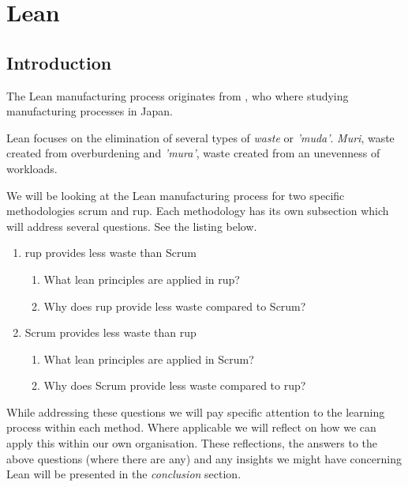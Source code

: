 \chapter{Lean}


\section{Introduction}

The Lean manufacturing process originates from \citep{womack1990machine}, who where studying manufacturing processes in Japan.

Lean focuses on the elimination of several types of \textit{waste} or \textit{'muda'}. \textit{Muri}, waste created from overburdening and \textit{'mura'}, waste created from an unevenness of workloads.

We will be looking at the Lean manufacturing process for two specific methodologies \ac{scrum} and \ac{rup}. Each methodology has its own subsection which will address several questions. See the listing below.
\begin{enumerate}
    \item \ac{rup} provides less waste than Scrum
        \begin{enumerate}
            \item What lean principles are applied in \ac{rup}?
            \item Why does \ac{rup} provide less waste compared to Scrum?
        \end{enumerate}
    \item Scrum provides less waste than \ac{rup}
        \begin{enumerate}
            \item What lean principles are applied in Scrum?
            \item Why does Scrum provide less waste compared to \ac{rup}?
        \end{enumerate}
\end{enumerate}

While addressing these questions we will pay specific attention to the learning process within each method. Where applicable we will reflect on how we can apply this within our own organisation. These reflections, the answers to the above questions (where there are any) and any  insights we might have concerning Lean will be presented in the \textit{conclusion} section.

